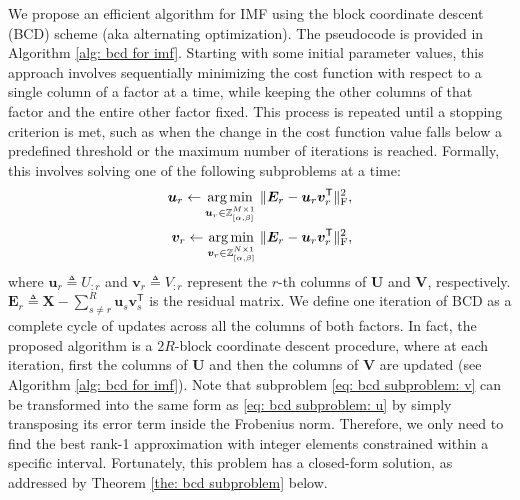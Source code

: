 We propose an efficient algorithm for IMF using the block coordinate descent (BCD) scheme (aka alternating optimization). 
The pseudocode is provided in Algorithm \ref{alg: bcd for imf}.
Starting with some initial parameter values, this approach involves sequentially minimizing the cost function with respect to a single column of a factor at a time, while keeping the other columns of that factor and the entire other factor fixed. This process is repeated until a stopping criterion is met, such as when the change in the cost function value falls below a predefined threshold or the maximum number of iterations is reached. Formally, this involves solving one of the following subproblems at a time:
\begin{align}  
	\bm{u}_r \gets \underset{\bm{u}_r \in \mathbb{Z}_{[\alpha,\beta]}^{M \times 1}}{\operatorname*{arg\,min}} \ \lVert \bm{E}_r - \bm{u}_r \bm{v}_r^\mathsf{T} \rVert_\text{F}^2, \label{eq: bcd subproblem: u} \\
	\bm{v}_r \gets \underset{\bm{v}_r \in \mathbb{Z}_{[\alpha,\beta]}^{N \times 1}}{\operatorname*{arg\,min}} \ \lVert \bm{E}_r - \bm{u}_r \bm{v}_r^\mathsf{T} \rVert_\text{F}^2, \label{eq: bcd subproblem: v}
\end{align}
where $\bm{u}_r \triangleq U_{:r}$ and $\bm{v}_r \triangleq V_{:r}$ represent the $r$-th columns of $\bm{U}$ and $\bm{V}$, respectively. $\bm{E}_r \triangleq \bm{X} - \sum_{s \neq r}^{R} \bm{u}_s \bm{v}_s^\mathsf{T}$ is the residual matrix. We define one iteration of BCD as a complete cycle of updates across all the columns of both factors. In fact, the proposed algorithm is a $2R$-block coordinate descent procedure, where at each iteration, first the columns of $\bm{U}$ and then the columns of $\bm{V}$ are updated (see Algorithm \ref{alg: bcd for imf}). Note that subproblem \eqref{eq: bcd subproblem: v} can be transformed into the same form as \eqref{eq: bcd subproblem: u} by simply transposing its error term inside the Frobenius norm. Therefore, we only need to find the best rank-1 approximation with integer elements constrained within a specific interval. Fortunately, this problem has a closed-form solution, as addressed by Theorem \ref{the: bcd subproblem} below.

